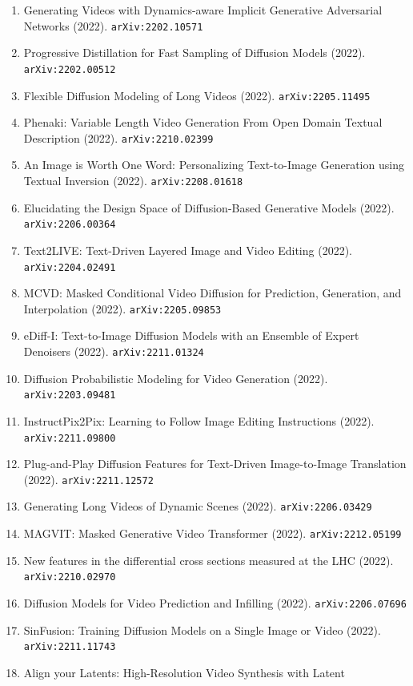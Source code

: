 \documentclass[11pt]{article}
\begin{document}
\begin{enumerate}
  \item Generating Videos with Dynamics-aware Implicit Generative Adversarial
  Networks (2022). \texttt{arXiv:2202.10571}
  \item Progressive Distillation for Fast Sampling of Diffusion Models (2022). \texttt{arXiv:2202.00512}
  \item Flexible Diffusion Modeling of Long Videos (2022). \texttt{arXiv:2205.11495}
  \item Phenaki: Variable Length Video Generation From Open Domain Textual
  Description (2022). \texttt{arXiv:2210.02399}
  \item An Image is Worth One Word: Personalizing Text-to-Image Generation using
  Textual Inversion (2022). \texttt{arXiv:2208.01618}
  \item Elucidating the Design Space of Diffusion-Based Generative Models (2022). \texttt{arXiv:2206.00364}
  \item Text2LIVE: Text-Driven Layered Image and Video Editing (2022). \texttt{arXiv:2204.02491}
  \item MCVD: Masked Conditional Video Diffusion for Prediction, Generation, and
  Interpolation (2022). \texttt{arXiv:2205.09853}
  \item eDiff-I: Text-to-Image Diffusion Models with an Ensemble of Expert
  Denoisers (2022). \texttt{arXiv:2211.01324}
  \item Diffusion Probabilistic Modeling for Video Generation (2022). \texttt{arXiv:2203.09481}
  \item InstructPix2Pix: Learning to Follow Image Editing Instructions (2022). \texttt{arXiv:2211.09800}
  \item Plug-and-Play Diffusion Features for Text-Driven Image-to-Image
  Translation (2022). \texttt{arXiv:2211.12572}
  \item Generating Long Videos of Dynamic Scenes (2022). \texttt{arXiv:2206.03429}
  \item MAGVIT: Masked Generative Video Transformer (2022). \texttt{arXiv:2212.05199}
  \item New features in the differential cross sections measured at the LHC (2022). \texttt{arXiv:2210.02970}
  \item Diffusion Models for Video Prediction and Infilling (2022). \texttt{arXiv:2206.07696}
  \item SinFusion: Training Diffusion Models on a Single Image or Video (2022). \texttt{arXiv:2211.11743}
  \item Align your Latents: High-Resolution Video Synthesis with Latent

\end{enumerate}
\end{document}
